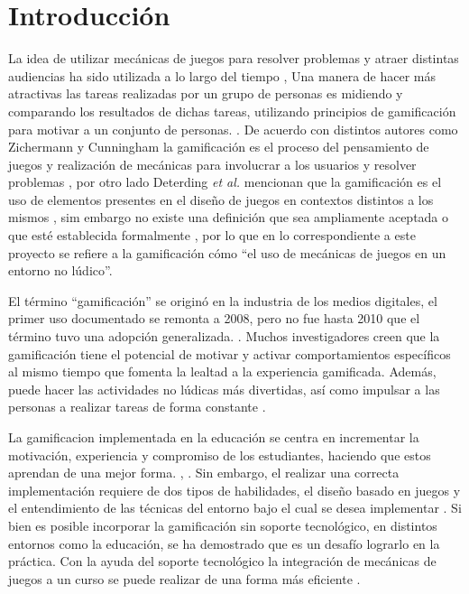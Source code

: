 
\section{Introducción}

    \noindent
    La idea de utilizar mecánicas de juegos para resolver problemas y atraer
    distintas audiencias ha sido utilizada a lo largo del tiempo \cite{GamByDesign},
%
    Una manera de hacer más atractivas las tareas realizadas por un grupo de
    personas es midiendo y comparando los resultados de dichas tareas, utilizando
    principios de gamificación para motivar a un conjunto de personas.
    \cite{Octalysis}.
%
    De acuerdo con distintos autores como Zichermann y Cunningham la gamificación es
    el proceso del pensamiento de juegos y realización de mecánicas para involucrar
    a los usuarios y resolver problemas \cite{GamByDesign}, por otro lado Deterding
    {\it et al.} mencionan que la gamificación es el uso de elementos presentes en
    el diseño de juegos en contextos distintos a los mismos \cite{DeterdingDefinition},
    sim embargo no existe una definición que sea ampliamente aceptada o que esté
    establecida formalmente \cite{Seaborn}, por lo que en lo correspondiente a este
    proyecto se refiere a la gamificación cómo ``el uso de mecánicas  de juegos en
    un entorno no lúdico''.\par
%
    \noindent 
    El término ``gamificación'' se originó en la industria de los medios digitales,
    el primer uso documentado se remonta a 2008, pero no fue hasta 2010 que el
    término tuvo una adopción generalizada. \cite{DeterdingGamefulness}. Muchos
    investigadores creen que la gamificación tiene el potencial de motivar y activar
    comportamientos específicos al mismo tiempo que fomenta la lealtad a la
    experiencia gamificada. Además, puede hacer las actividades no lúdicas más
    divertidas, así como impulsar a las personas a realizar tareas de forma
    constante \cite{Aldemir}.\par
%
    \noindent
    La gamificacion implementada en la educación se centra en incrementar la
    motivación, experiencia y compromiso de los estudiantes, haciendo que estos
    aprendan de una mejor forma. \cite{GamInE-Learning}, \cite{Lee}.
%
    Sin embargo, el realizar una correcta implementación requiere de dos tipos
    de habilidades, el diseño basado en juegos y el entendimiento de las técnicas
    del entorno bajo el cual se desea implementar \cite{ForTheWin}.
%
    Si bien es posible incorporar la gamificación sin soporte tecnológico,
    en distintos entornos como la educación, se ha demostrado que es un desafío
    lograrlo en la práctica. Con la ayuda del soporte tecnológico la integración
    de mecánicas de juegos a un curso se puede realizar de una forma más eficiente
    \cite{Wood-Reiners}.

